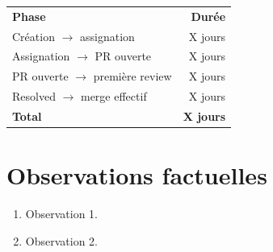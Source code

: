 \documentclass[11pt,a4paper]{article}
\begin{document}
\begin{tabular}{lr}
\rowcolor{tealPrimary}\textbf{\color{white}Phase} & \textbf{\color{white}Durée} \\
Création $\rightarrow$ assignation     & X jours \\
Assignation $\rightarrow$ PR ouverte   & X jours \\
PR ouverte $\rightarrow$ première review & X jours \\
Resolved $\rightarrow$ merge effectif  & X jours \\
\rowcolor{tealBand}\textbf{Total}      & \textbf{X jours} \\
\end{tabular}

\section*{Observations factuelles}

\begin{infobox}
\sffamily
\begin{enumerate}[leftmargin=*]
\item Observation 1.
\item Observation 2.
\end{enumerate}
\end{infobox}
\end{document}
